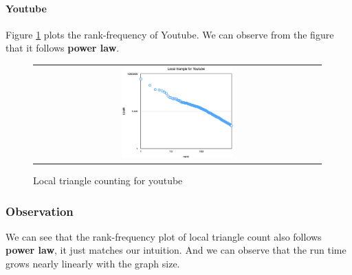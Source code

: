 \paragraph{Youtube}
Figure \ref{t7:youtube} plots the rank-frequency of Youtube. We can observe from the figure that it follows {\bf power law}. 
\begin{figure}[!htbf]
\begin{center}
\begin{tabular}{c}
     \includegraphics[width=0.4\textwidth]{FIG/t7_youtube.png}
\end{tabular}
\caption{Local triangle counting for youtube}
\label{t7:youtube}
\end{center}
\end{figure}


\subsubsection{Observation}
We can see that the rank-frequency plot of local triangle count also follows {\bf power law}, it just matches our intuition. And we can observe that the run time grows nearly linearly with the graph size. 
